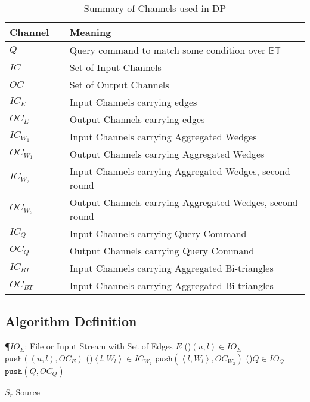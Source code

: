 \documentclass[12pt, a4paper]{article}
\newcommand{\bt}{\mathbb{BT}}
\newcommand{\p}{\mathtt{push}}
\newcommand{\la}{\left\langle}
\newcommand{\ra}{\right\rangle}
\begin{document}
%      
\begin{table}[h!]
\centering
\begin{tabular}{|p{0.2\linewidth}|p{0.8\linewidth}|} \hline
\textbf{Channel} & \textbf{Meaning}\\ \hline
$Q$ & Query command to match some condition over $\bt$ \\ \hline
$IC$ & Set of Input Channels \\ \hline
$OC$ & Set of Output Channels \\ \hline
$IC_E$ & Input Channels carrying edges \\ \hline
$OC_E$ & Output Channels carrying edges \\ \hline
$IC_{W_1}$ & Input Channels carrying Aggregated Wedges \\ \hline
$OC_{W_1}$ & Output Channels carrying Aggregated Wedges \\ \hline
$IC_{W_2}$ & Input Channels carrying Aggregated Wedges, second round \\ \hline
$OC_{W_2}$ & Output Channels carrying Aggregated Wedges, second round \\ \hline
$IC_Q$ & Input Channels carrying Query Command \\ \hline
$OC_Q$ & Output Channels carrying Query Command \\ \hline
$IC_{BT}$ & Input Channels carrying Aggregated Bi-triangles \\ \hline
$OC_{BT}$ & Input Channels carrying Aggregated Bi-triangles \\ \hline
\end{tabular}
\caption{Summary of Channels used in DP}
\label{table:channels}
\end{table}
%      
      
\subsection{Algorithm Definition}
\begin{algorithm}
\P{$IO_E$: File or Input Stream with Set of Edges $E$}
\IC{$IC = \la IC_{W_2} \ra$}
\OC{$OC = \la OC_E, OC_{W_2}, OC_Q \ra$}
\ForAll(){$(u,l) \in IO_E$}
{$\p((u,l), OC_E)$
}
\ForAll(){$\la l, W_l \ra \in IC_{W_2}$}
{$\p(\la l, W_l \ra, OC_{W_2})$
}
\ForAll(){$Q \in IO_Q$}
{$\p(Q, OC_Q)$
}
\caption{$S_r$ Source}
\end{algorithm}
\end{document}
